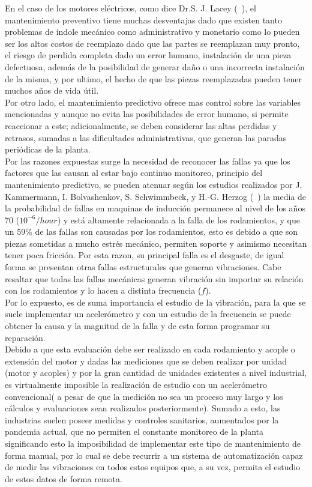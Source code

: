 	En el caso de los motores eléctricos, como dice Dr.S. J. Lacey (~\cite{Lacey}), el mantenimiento preventivo tiene muchas desventajas dado que existen tanto problemas de índole mecánico como administrativo y monetario como lo pueden ser los altos costos de reemplazo dado que las partes se reemplazan muy pronto, el riesgo de perdida completa dado un error humano, instalación de una pieza defectuosa, además de la posibilidad de generar daño o una incorrecta instalación de la misma, y por ultimo, el hecho de que las piezas reemplazadas pueden tener muchos años de vida útil.\\
	
	Por otro lado, el mantenimiento predictivo ofrece mas control sobre las variables mencionadas y aunque no evita las posibilidades de error humano, si permite reaccionar a este; adicionalmente, se deben considerar las altas perdidas y retrasos, sumadas a las dificultades administrativas, que generan las paradas periódicas de la planta.\\

	Por las razones expuestas surge la necesidad de reconocer las fallas ya que los factores que las causan al estar bajo continuo monitoreo, principio del mantenimiento predictivo, se pueden atenuar según los estudios realizados por J. Kammermann, I. Bolvashenkov, S. Schwimmbeck, y H.-G. Herzog (~\cite{Kammermann}) la media de la probabilidad de fallas en maquinas de inducción permanece al nivel de los años 70 ($10^{-6}/hour$) y está altamente relacionada a la falla de los rodamientos, y que un 59\% de las fallas son causadas por los rodamientos, esto es debido a que son piezas sometidas a mucho estrés mecánico, permiten soporte y asimismo necesitan tener poca fricción. Por esta razon, su principal falla es el desgaste, de igual forma se presentan otras fallas estructurales que generan vibraciones. Cabe resaltar que todas las fallas mecánicas generan vibración sin importar su relación con los rodamientos y lo hacen a distinta frecuencia ($f$). \\


	Por lo expuesto, es de suma importancia el estudio de la vibración, para la que se suele implementar un acelerómetro y con un estudio de la frecuencia se puede obtener la causa y la magnitud de la falla y de esta forma programar su reparación.\\
	Debido a que esta evaluación debe ser realizado en cada rodamiento y acople o extensión del motor y dadas las mediciones que se deben realizar por unidad (motor y acoples) y por la gran cantidad de unidades existentes a nivel industrial, es virtualmente imposible la realización de estudio con un acelerómetro convencional( a pesar de que la medición no sea un proceso muy largo y los cálculos y evaluaciones sean realizados posteriormente). Sumado a esto, las industrias suelen poseer medidas y controles sanitarios, aumentados por la pandemia actual, que no permiten el constante monitoreo de la planta significando esto la imposibilidad de implementar este tipo de mantenimiento de forma manual, por lo cual se debe recurrir a un sistema de automatización capaz de medir las vibraciones en todos estos equipos que, a su vez, permita el estudio de estos datos de forma remota. \\

	

